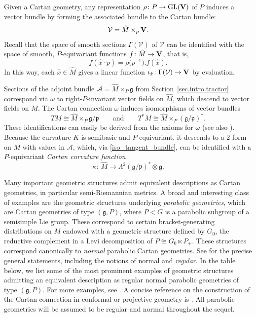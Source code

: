 \documentclass[10pt,a4paper]{amsart}
\numberwithin{equation}{section}
\theoremstyle{definition}
\newcommand{\lieg}{\mathfrak{g}}
\def\g{{\mathfrak g}}
\def\p{{\mathfrak p}}
\begin{document}
 Given a Cartan geometry, any representation $\rho\colon P\rightarrow\textrm{GL}({\bf V})$ of $P$ induces
 a vector bundle by forming the associated bundle to the Cartan bundle:
 \[
 \mathcal V =\hat{M} \times_\rho {\bf V}.
 \]
 Recall that the space of smooth sections $\Gamma(\mathcal V)$ of $\mathcal V$ can be identified with the space  of smooth, $P$-equivariant functions $f\colon \hat{M}\rightarrow {\bf V}$, that is,
 \[f(\hat{x}\cdot p)= {\rho\bigl(p^{-1}\bigr). f(\hat{x})}.\]
 In this way, each $\hat{x} \in \hat{M}$ gives a linear function $\iota_{\hat{x}}\colon \Gamma(\mathcal{V}) \rightarrow {\bf V}$ by evaluation.

 Sections of the adjoint bundle $\mathcal{A} = \hat{M} \times_P \lieg$ from Section~\ref{sec.intro.tractor} correspond via $\omega$ to right-$P$-invariant vector fields on $\hat{M}$, which descend to vector fields on $M$.
The Cartan connection $\omega$ induces isomorphisms of vector bundles
 \begin{equation}\label{iso_tangent_bundle}
 TM\cong \hat{M} \times_P \g/\p\qquad\textrm{and}\qquad T^*M\cong \hat{M} \times_P (\g/\p)^*.
 \end{equation}
 These identifications can easily be derived from the axioms for $\omega$ (see also \cite[Theorem~5.3.15]{sharpe}).
 Because the curvature $K$ is semibasic and $P$-equivariant, it
 descends to a $2$-form on $M$ with values in $\mathcal{A}$, which, via \eqref{iso_tangent_bundle}, can be identified with a $P$-equivariant \emph{Cartan curvature function}
 \begin{equation*}
 \kappa\colon\ \hat{M} \rightarrow\Lambda^2 (\g/\p)^*\otimes \g.%
 \end{equation*}

Many important geometric structures admit equivalent descriptions as Cartan geometries, in particular semi-Riemannian metrics. A broad and interesting class of examples are the geometric structures underlying \emph{parabolic geometries}, which are Cartan geometries of type $(\g,P)$, where $P<G$ is a parabolic subgroup of a semisimple Lie group.
These correspond to certain bracket-generating distributions on $M$ endowed with a geometric structure defined by $G_0$, the reductive complement in a Levi decomposition of $P \cong G_0 \ltimes P_+$. These structures correspond canonically to \emph{normal} parabolic Cartan geometries. See \cite{cap.schichl.equiv,morimoto,tanaka} for the precise general statements, including the notions of normal and \emph{regular}.
In the table below, we list some of the most prominent examples of geometric structures admitting an equivalent description as regular normal parabolic geometries of type $(\g,P)$. For more examples, see \cite{cap.slovak.book.vol1}. A concise reference on the construction
of the Cartan connection in conformal or projective geometry is \cite[Section IV]{kobayashi.transf}. All parabolic geometries will be assumed to be regular and normal throughout the sequel.
\end{document}
